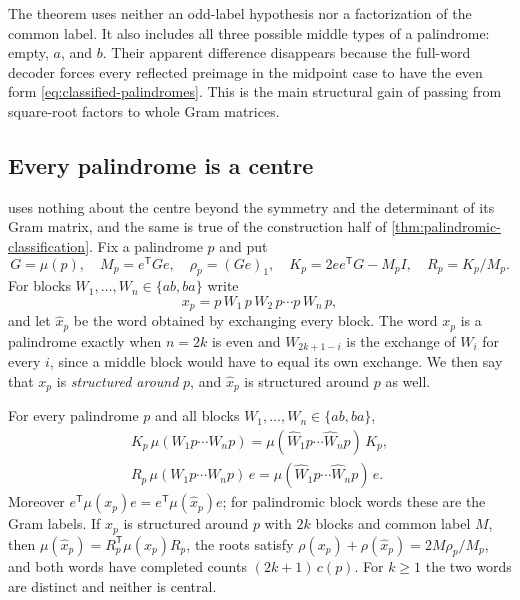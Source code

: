 The theorem uses neither an odd-label hypothesis nor a factorization
of the common label. It also includes all three possible middle types
of a palindrome: empty, $a$, and $b$. Their apparent difference
disappears because the full-word decoder forces every reflected
preimage in the midpoint case to have the even form
\eqref{eq:classified-palindromes}. This is the main structural gain
of passing from square-root factors to whole Gram matrices.

\subsection{Every palindrome is a centre}
\label{subsec:any-centre}

 uses nothing about the centre beyond the symmetry and the
determinant of its Gram matrix, and the same is true of the construction half of
\cref{thm:palindromic-classification}. Fix a palindrome $p$ and put
$$
 G=\mu(p),\quad M_p=e^{\mathsf T}Ge,\quad \rho_p=(Ge)_1,\quad
 K_p=2ee^{\mathsf T}G-M_pI,\quad R_p=K_p/M_p .
$$
For blocks $W_1,\dots,W_n\in\{ab,ba\}$ write
$$
 x_p=p\,W_1\,p\,W_2\,p\cdots p\,W_n\,p ,
$$
and let $\widehat x_p$ be the word obtained by exchanging every block. The word $x_p$ is a
palindrome exactly when $n=2k$ is even and $W_{2k+1-i}$ is the exchange of $W_i$ for every
$i$, since a middle block would have to equal its own exchange. We then say that $x_p$ is
\emph{structured around} $p$, and $\widehat x_p$ is structured around $p$ as well.

\begin{proposition}
\label{prop:any-centre}
For every palindrome $p$ and all blocks $W_1,\dots,W_n\in\{ab,ba\}$,
$$
 \begin{gathered}
 K_p\,\mu(W_1p\cdots W_np)=\mu(\widehat W_1p\cdots\widehat W_np)\,K_p ,\\
 R_p\,\mu(W_1p\cdots W_np)\,e=\mu(\widehat W_1p\cdots\widehat W_np)\,e .
 \end{gathered}
$$
Moreover $e^{\mathsf T}\mu(x_p)e=e^{\mathsf T}\mu(\widehat x_p)e$; for palindromic block words
these are the Gram labels. If $x_p$ is structured around $p$ with $2k$ blocks and common label $M$, then
$\mu(\widehat x_p)=R_p^{\mathsf T}\mu(x_p)R_p$, the roots satisfy
$\rho(x_p)+\rho(\widehat x_p)=2M\rho_p/M_p$, and both words have completed counts
$(2k+1)\,c(p)$. For $k\geqslant1$ the two words are distinct and neither is central.
\end{proposition}

